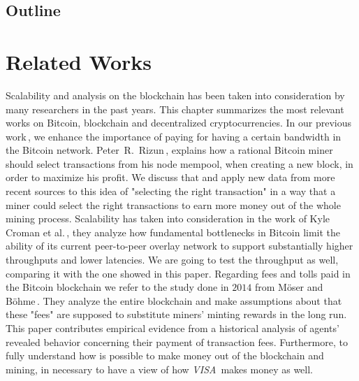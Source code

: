 \documentclass[USenglish]{uit-thesis}
\begin{document}
\section{Outline}
\label{sec:outline}

\chapter{Related Works}
\label{chap:prev_works}
Scalability and analysis on the blockchain
has been taken into consideration
by many researchers in the past years.
This chapter summarizes the most
relevant works on Bitcoin,
blockchain and decentralized cryptocurrencies.
In our previous work\,\cite{Tedeschi:2016:PBB}, we enhance
the importance of paying for having a certain
bandwidth in the Bitcoin network.
Peter~R.~Rizun\,\cite{Rizun:2015:blocksizelimit},
explains how a rational Bitcoin
miner should select transactions from his node mempool,
when creating a new block,
in order to maximize his profit. We discuss that and apply
new data from more recent sources to this idea of
"selecting the right transaction" in a way that a miner could
select the right transactions to earn more money out of the whole
mining process.
Scalability has taken into consideration
in the work of Kyle Croman et al.\,\cite{croman2016}, they
analyze how fundamental bottlenecks in Bitcoin limit the ability
of its current peer-to-peer
overlay network to support substantially higher
throughputs and lower latencies. We are
going to test the throughput as well, comparing it with the one
showed in this paper.
Regarding fees and tolls paid in the Bitcoin blockchain
we refer to the study done in $2014$ from Möser and
Böhme\,\cite{Moser2015}. They analyze the
entire blockchain and make assumptions about
that these "fees" are supposed to substitute miners'
minting rewards in the long run. This paper
contributes empirical evidence from a historical
analysis of agents' revealed behavior concerning
their payment of transaction fees.
Furthermore, to fully understand how is possible
to make money out of the blockchain and mining,
in necessary to have a view of
how \emph{VISA}\,\cite{visa} makes money as well.
\end{document}
